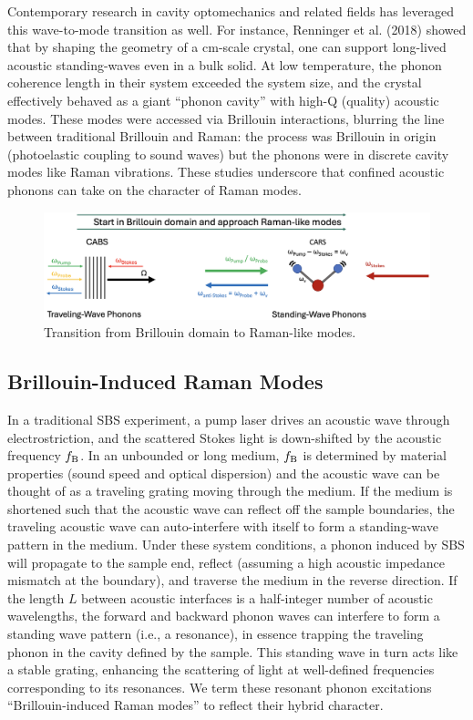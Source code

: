 Contemporary research in cavity optomechanics and related fields has leveraged this wave-to-mode transition as well. For instance, Renninger et al. (2018) \cite{renninger2018bulk} showed that by shaping the geometry of a \si{\centi\meter}-scale crystal, one can support long-lived acoustic standing-waves even in a bulk solid. At low temperature, the phonon coherence length in their system exceeded the system size, and the crystal effectively behaved as a giant “phonon cavity” with high-Q (quality) acoustic modes. \cite{renninger2018bulk, maccabe2020nano} These modes were accessed via Brillouin interactions, blurring the line between traditional Brillouin and Raman: the process was Brillouin in origin (photoelastic coupling to sound waves) but the phonons were in discrete cavity modes like Raman vibrations. These studies underscore that confined acoustic phonons can take on the character of Raman modes.

\begin{figure}[t]
  \centering
  \includegraphics[width=\textwidth]{figs/4-Raman/ExploreBrillouinRamanTransition.png}
  \caption{Transition from Brillouin domain to Raman-like modes.}
  \label{fig:Raman:BrillouinRamanTransition}
\end{figure}

\subsection{Brillouin-Induced Raman Modes}
\label{subsec:Raman:Brillouin-InducedRamanModes}

In a traditional SBS experiment, a pump laser drives an acoustic wave through electrostriction, and the scattered Stokes light is down-shifted by the acoustic frequency \(f_{\rm B}\). In an unbounded or long medium, \(f_{\rm B}\) is determined by material properties (sound speed and optical dispersion) and the acoustic wave can be thought of as a traveling grating moving through the medium. If the medium is shortened such that the acoustic wave can reflect off the sample boundaries, the traveling acoustic wave can auto-interfere with itself to form a standing-wave pattern in the medium. Under these system conditions, a phonon induced by \ac{SBS} will propagate to the sample end, reflect (assuming a high acoustic impedance mismatch at the boundary), and traverse the medium in the reverse direction. If the length \(L\) between acoustic interfaces is a half-integer number of acoustic wavelengths, the forward and backward phonon waves can interfere to form a standing wave pattern (i.e., a resonance), in essence trapping the traveling phonon in the cavity defined by the sample. This standing wave in turn acts like a stable grating, enhancing the scattering of light at well-defined frequencies corresponding to its resonances. We term these resonant phonon excitations “Brillouin-induced Raman modes” to reflect their hybrid character.

